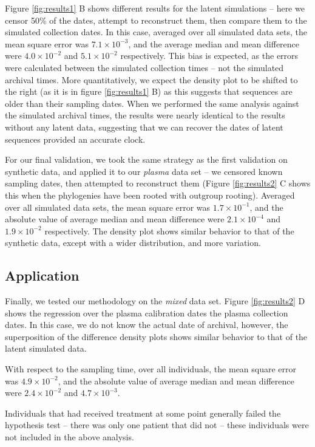 Figure \ref{fig:results1} B shows different results for the latent simulations -- here we censor 50\% of the dates, attempt to reconstruct them, then compare them to the simulated collection dates. 
In this case, averaged over all simulated data sets, the mean square error was $7.1\times 10^{-3}$, and the average median and mean difference were $4.0\times 10^{-2}$ and $5.1\times 10^{-2}$ respectively. 
This bias is expected, as the errors were calculated between the simulated collection times -- not the simulated archival times.
More quantitatively, we expect the density plot to be shifted to the right (as it is in figure \ref{fig:results1} B) as this suggests that sequences are older than their sampling dates.
When we performed the same analysis against the simulated archival times, the results were nearly identical to the results without any latent data, suggesting that we can recover the dates of latent sequences provided an accurate clock.

For our final validation, we took the same strategy as the first validation on synthetic data, and applied it to our {\em plasma} data set -- we censored known sampling dates, then attempted to reconstruct them (Figure \ref{fig:results2} C shows this when the phylogenies have been rooted with outgroup rooting). 
Averaged over all simulated data sets, the mean square error was $1.7\times 10^{-1}$, and the absolute value of average median and mean difference were $2.1\times 10^{-4}$ and $1.9\times 10^{-2}$ respectively. 
The density plot shows similar behavior to that of the synthetic data, except with a wider distribution, and more variation. 

\subsection{Application} \label{sec:mixed_data}

Finally, we tested our methodology on the {\em mixed} data set.
Figure \ref{fig:results2} D shows the regression over the plasma calibration dates the plasma collection dates. 
In this case, we do not know the actual date of archival, however, the superposition of the difference density plots shows similar behavior to that of the latent simulated data.

With respect to the sampling time, over all individuals, the mean square error was $4.9\times 10^{-2}$, and the absolute value of average median and mean difference were $2.4\times 10^{-2}$ and $4.7\times 10^{-3}$.

Individuals that had received treatment at some point generally failed the hypothesis test -- there was only one patient that did not -- these individuals were not included in the above analysis. 

